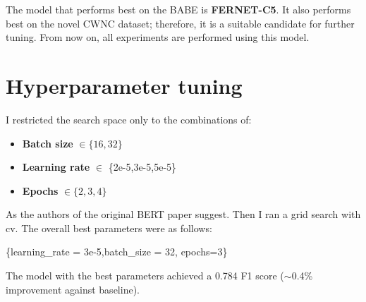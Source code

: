  The model that performs best on the BABE is \textbf{FERNET-C5}. It also performs best on the novel CWNC dataset; therefore, it is a suitable candidate for further tuning. From now on, all experiments are performed using this model.
 

 

 
 
 
 
\newpage

 \section{Hyperparameter tuning}
I restricted the search space only to the combinations of:
 \begin{itemize}
     \item \textbf{Batch size} $\in \{16,32\}$
     \item \textbf{Learning rate} $\in $ \{2e-5,3e-5,5e-5\}
     \item \textbf{Epochs} $\in \{2,3,4\}$
 \end{itemize}
 
 As the authors of the original BERT paper suggest. Then I ran a grid search with \gls{cv}. The overall best parameters were as follows:
 \begin{center}
      \{learning\_rate = 3e-5,batch\_size = 32, epochs=3\}\label{hyperparams}
 \end{center}
 
 The model with the best parameters achieved a 0.784 F1 score ($\sim$0.4\% improvement against baseline).


 
 







